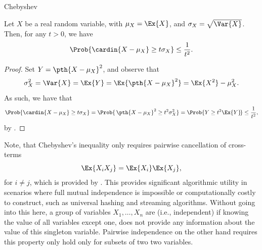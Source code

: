 \begin{fragment}{Chebyshev}
    \begin{theorem}
        Let $X$ be a real random variable, with $\mu_X = \Ex{X}$, and
        $\sigma_X = \sqrt{\Var{X}}$. Then, for any $t > 0$, we have
        \begin{equation*}
            \Prob{\bigl. \cardin{X - \mu_X} \geq t \sigma_X} \leq
            \frac{1}{t^2}.
        \end{equation*}
    \end{theorem}
\end{fragment}



\begin{proof}
    Set $Y = \pth{X - \mu_X}^2$, and observe that
    \begin{equation*}
        \sigma_X^2
        =%
        \Var{X} =
        \Ex{ Y}
        =%
        \Ex{\pth{X - \mu_X}^2}
        =%
        \Ex{X^2}  - \mu_X^2.
    \end{equation*}
    As such, we have that
    \begin{equation*}
        \Prob{\bigl. \cardin{X - \mu_X}\geq t \sigma_X}%
        =%
        \Prob{\,\pth{X - \mu_X}^2\geq t^2 \sigma_X^2}
        =%
        \Prob{ Y \geq t^2 \Ex{Y}\bigl.\!}
        \leq%
        \frac{1}{t^2},
    \end{equation*}
    by .
\end{proof}

\begin{remark}
    Note, that Chebyshev's inequality only requires pairwise cancellation of
    cross-terms 
    \begin{equation*}
        \Ex{X_i X_j} = \Ex{X_i}\Ex{X_j},
    \end{equation*}
     for $i \neq j$, which is provided by
    . This provides significant algorithmic
    utility in scenarios where full mutual independence is impossible or
    computationally costly to construct, such as universal hashing and
    streaming algorithms.  Without going into this here, a group of
    variables $X_1, \ldots, X_n$ are  (i.e.,
    independent) if knowing the value of all variables except one, does
    not provide any information about the value of this singleton
    variable. Pairwise independence on the other hand requires this
    property only hold only for subsets of two two variables.
\end{remark}


